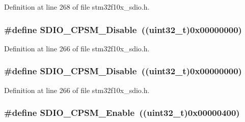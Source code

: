 Definition at line 268 of file stm32f10x\+\_\+sdio.\+h.

\subsubsection[{\texorpdfstring{S\+D\+I\+O\+\_\+\+C\+P\+S\+M\+\_\+\+Disable}{SDIO_CPSM_Disable}}]{\setlength{\rightskip}{0pt plus 5cm}\#define S\+D\+I\+O\+\_\+\+C\+P\+S\+M\+\_\+\+Disable~(({\bf uint32\+\_\+t})0x00000000)}\hypertarget{group___s_d_i_o___c_p_s_m___state_ga996751273ad238e255a740f7c2844c6c}{}\label{group___s_d_i_o___c_p_s_m___state_ga996751273ad238e255a740f7c2844c6c}


Definition at line 266 of file stm32f10x\+\_\+sdio.\+h.

\subsubsection[{\texorpdfstring{S\+D\+I\+O\+\_\+\+C\+P\+S\+M\+\_\+\+Disable}{SDIO_CPSM_Disable}}]{\setlength{\rightskip}{0pt plus 5cm}\#define S\+D\+I\+O\+\_\+\+C\+P\+S\+M\+\_\+\+Disable~(({\bf uint32\+\_\+t})0x00000000)}\hypertarget{group___s_d_i_o___c_p_s_m___state_ga996751273ad238e255a740f7c2844c6c}{}\label{group___s_d_i_o___c_p_s_m___state_ga996751273ad238e255a740f7c2844c6c}


Definition at line 266 of file stm32f10x\+\_\+sdio.\+h.

\subsubsection[{\texorpdfstring{S\+D\+I\+O\+\_\+\+C\+P\+S\+M\+\_\+\+Enable}{SDIO_CPSM_Enable}}]{\setlength{\rightskip}{0pt plus 5cm}\#define S\+D\+I\+O\+\_\+\+C\+P\+S\+M\+\_\+\+Enable~(({\bf uint32\+\_\+t})0x00000400)}\hypertarget{group___s_d_i_o___c_p_s_m___state_gad437cefe89d6175aa074a1c40b909ebc}{}\label{group___s_d_i_o___c_p_s_m___state_gad437cefe89d6175aa074a1c40b909ebc}


